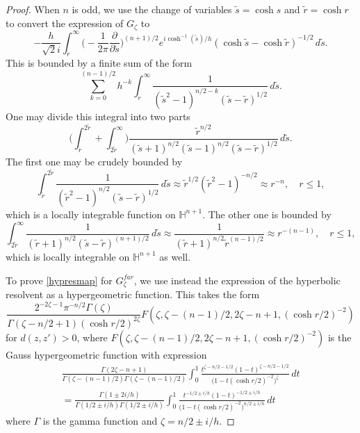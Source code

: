 \documentclass[10pt, a4paper, twoside]{amsart}
\numberwithin{equation}{section}
\theoremstyle{remark}
\begin{document}
\begin{proof}
When $n$ is odd, we use the change of variables $\tilde{s} = \cosh s$ and $\tilde{r} = \cosh r$ to convert the expression of $G_\zeta$ to 
$$
- \frac{h}{\sqrt{2} i} \int_{\tilde r}^\infty \big(- \frac{1}{2\pi}  \frac{\partial}{\partial \tilde s} \big)^{(n + 1)/2} e^{i \cosh^{-1}(\tilde s)/h} (\cosh \tilde s - \cosh \tilde r)^{-1/2}  \, d\tilde s.
$$
This is bounded by a finite sum of the form 
$$
\sum_{k=0}^{(n-1)/2} h^{-k} \int _{\tilde{r}}^\infty \frac{1}{(\tilde{s}^2 - 1)^{n/2 - k} (\tilde{s} - \tilde{r})^{1/2}  }  \,d\tilde{s}.
$$
 One may divide this integral into two parts $$\bigg(\int_{\tilde{r}}^{2\tilde{r}}   + \int_{2\tilde{r}}^\infty\bigg) \frac{\tilde{r}^{n/2}}{(\tilde{s} + 1)^{n/2} (\tilde{s} - 1)^{n/2} (\tilde{s} - \tilde{r})^{1/2}  }  \,d\tilde{s}. $$ The first one may be crudely bounded by 
 $$
 \int_{\tilde{r}}^{2\tilde{r}}   \frac{1}{ (\tilde{r}^2 - 1)^{n/2} (\tilde{s} - \tilde{r})^{1/2}  }  \,d\tilde{s} \approx  
 \tilde{r}^{1/2 } (\tilde{r}^2 - 1)^{-n/2} \approx r^{-n}, \quad r \leq 1, 
 $$ 
 which is a locally integrable function on $\mathbb{H}^{n + 1}$. The other one is bounded by 
 $$
 \int_{2\tilde{r}}^\infty \frac{1}{(\tilde{r} + 1)^{n/2} (\tilde{s} - \tilde{r})^{(n + 1)/2} }  \,d\tilde{s} \approx  \frac{1}{(\tilde{r} + 1)^{n/2} \tilde{r}^{(n - 1)/2}  } \approx r^{-(n-1)}, \quad r \leq 1,$$ which is locally integrable on $\mathbb{H}^{n + 1}$ as well.

To prove \eqref{hypresmap} for $G_\zeta^{far}$, we use instead the expression of the hyperbolic resolvent as a hypergeometric function. This takes the form 
 \begin{equation}\label{eqn: hypergeometric function}\frac{2^{-2\zeta - 1} \pi^{- n /2} \Gamma(\zeta)}{\Gamma(\zeta - n/2 + 1) (\cosh r/2)^{2\zeta}} F(\zeta, \zeta - (n-1)/2, 2\zeta - n + 1, (\cosh r/2)^{-2})
 \end{equation} 
 for $d(z, z') > 0$, where $F(\zeta, \zeta - (n-1)/2, 2\zeta - n + 1, (\cosh r/2)^{-2})$ is the Gauss hypergeometric function with expression 
 \begin{equation}\begin{gathered}
 \frac{\Gamma(2 \zeta - n + 1)}{\Gamma(\zeta - (n - 1)/2) \Gamma(\zeta - (n - 1)/2)} \int_0^1 \frac{t^{\zeta - n/2 - 1/2} (1 - t)^{\zeta - n/2 - 1/2}}{\big(1 - t (\cosh r/2)^{-2})^\zeta} \,dt \\
 =  \frac{\Gamma(1 \pm 2i/h)}{\Gamma(1/2 \pm i/h) \Gamma(1/2 \pm i/h)} \int_0^1 \frac{t^{ - 1/2 \pm i/h} (1 - t)^{- 1/2 \pm i/h}}{\big(1 - t (\cosh r/2)^{-2})^{n/2 \pm i/h}} \,dt
\end{gathered} \label{Fabc}\end{equation}
  where $\Gamma$ is the gamma function and  $\zeta = n/2 \pm i/h$.


\end{proof}
\end{document}
